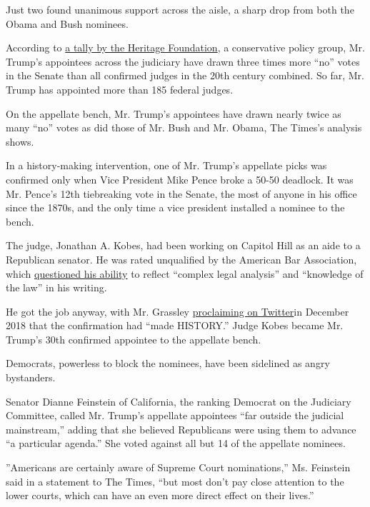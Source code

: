 Just two found unanimous support across the aisle, a sharp drop from
both the Obama and Bush nominees.

According to
\href{https://www.heritage.org/courts/commentary/filling-the-judicial-confirmation-stocking}{a
tally by the Heritage Foundation}, a conservative policy group, Mr.
Trump's appointees across the judiciary have drawn three times more
``no'' votes in the Senate than all confirmed judges in the 20th century
combined. So far, Mr. Trump has appointed more than 185 federal judges.

On the appellate bench, Mr. Trump's appointees have drawn nearly twice
as many ``no'' votes as did those of Mr. Bush and Mr. Obama, The Times's
analysis shows.

In a history-making intervention, one of Mr. Trump's appellate picks was
confirmed only when Vice President Mike Pence broke a 50-50 deadlock. It
was Mr. Pence's 12th tiebreaking vote in the Senate, the most of anyone
in his office since the 1870s, and the only time a vice president
installed a nominee to the bench.

The judge, Jonathan A. Kobes, had been working on Capitol Hill as an
aide to a Republican senator. He was rated unqualified by the American
Bar Association, which
\href{https://www.americanbar.org/content/dam/aba/uncategorized/GAO/2018-9-14ChairtoGrassleyFeinstein-statementon-JonathanKobesnominee-EighthCCA.pdf}{questioned
his ability} to reflect ``complex legal analysis'' and ``knowledge of
the law'' in his writing.

He got the job anyway, with Mr. Grassley
\href{https://twitter.com/chuckgrassley/status/1072638424664952835?lang=en}{proclaiming
on Twitter}in December 2018 that the confirmation had ``made HISTORY.''
Judge Kobes became Mr. Trump's 30th confirmed appointee to the appellate
bench.

Democrats, powerless to block the nominees, have been sidelined as angry
bystanders.

Senator Dianne Feinstein of California, the ranking Democrat on the
Judiciary Committee, called Mr. Trump's appellate appointees ``far
outside the judicial mainstream,'' adding that she believed Republicans
were using them to advance ``a particular agenda.'' She voted against
all but 14 of the appellate nominees.

''Americans are certainly aware of Supreme Court nominations,'' Ms.
Feinstein said in a statement to The Times, ``but most don't pay close
attention to the lower courts, which can have an even more direct effect
on their lives.''

